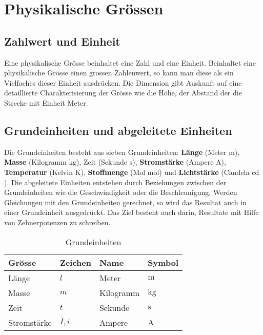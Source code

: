 \section{Physikalische Grössen}
\subsection{Zahlwert und Einheit}
Eine physikalische Grösse beinhaltet eine Zahl und eine Einheit. Beinhaltet eine physikalische Grösse einen grossen Zahlenwert, so kann man diese als ein Vielfaches dieser Einheit ausdrücken. Die Dimension gibt Auskunft auf eine detaillierte Charakterisierung der Grösse wie die Höhe, der Abstand der die Strecke mit Einheit Meter.
\subsection{Grundeinheiten und abgeleitete Einheiten}
Die Grundeinheiten besteht aus sieben Grundeinheiten: \textbf{Länge} (Meter $\text{m}$), \textbf{Masse} (Kilogramm $\text{kg}$), Zeit (Sekunde $\text{s}$), \textbf{Stromstärke} (Ampere $\text{A}$), \textbf{Temperatur} (Kelvin $\text{K}$), \textbf{Stoffmenge} (Mol $\text{mol}$) und \textbf{Lichtstärke} (Candela $\text{cd}$).
\newline\newline
Die abgeleitete Einheiten entstehen durch Beziehungen zwischen der Grundeinheiten wie die Geschwindigkeit oder die Beschleunigung.
\newline\newline
Werden Gleichungen mit den Grundeinheiten gerechnet, so wird das Resultat auch in einer Grundeinheit ausgedrückt. Das Ziel besteht auch darin, Resultate mit Hilfe von Zehnerpotenzen zu schreiben.
\begin{table}[H]
\centering
\begin{tabular}{llll}
\hline
Grösse&Zeichen&Name&Symbol\\\hline
Länge&$l$&Meter&$\text{m}$\\
Masse&$m$&Kilogramm&$\text{kg}$\\
Zeit&$t$&Sekunde&$\text{s}$\\
Stromstärke&$I, i$&Ampere&$\text{A}$\\\hline
\end{tabular}
\caption{Grundeinheiten}
\end{table}
